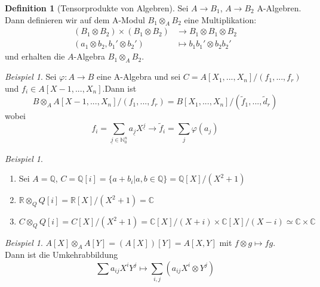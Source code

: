 \documentclass[10pt,a4paper]{article}
\newcommand{\N}{\ensuremath{\mathbb{N}}}
\newcommand{\Q}{\ensuremath{\mathbb{Q}}}
\newcommand{\R}{\ensuremath{\mathbb{R}}}
\newcommand{\C}{\ensuremath{\mathbb{C}}}
\newcommand{\ul}[1]{\underline{#1}}
\newcounter{thm}[section]
\theoremstyle{definition}
\newtheorem{definition}[thm]{Definition}
\theoremstyle{plain}
\theoremstyle{remark}
\newtheorem{exm}[thm]{Beispiel}
\begin{document}
\addtocounter{thm}{-1}
\begin{definition}[Tensorprodukte von Algebren]
	Sei $A\rightarrow  B_1$, $A\rightarrow  B_2$ A-Algebren.\\
	Dann definieren wir auf dem A-Modul $B_1\otimes_A B_2$ eine Multiplikation:
	\begin{align*}
	(B_1\otimes B_2)\times(B_1\otimes B_2)&\rightarrow B_1\otimes B_1\otimes B_2\\
	(a_1\otimes b_2,b_1'\otimes b_2')&\mapsto b_1b_1'\otimes b_2b_2'
	\end{align*}
	und erhalten die $A$-Algebra $B_1\otimes_A B_2$.
\end{definition}
\begin{exm}
	Sei $\varphi:A\to B$ eine A-Algebra und sei $C=A[X_1,...,X_n]/(f_1,...,f_r)$ und $f_i\in A[X-1,...,X_n]$.Dann ist
	\[B\otimes_A A[X-1,...,X_n]/(f_1,...,f_r)=B[X_1,...,X_n]/(\tilde{f}_1,...,\tilde{d}_r)\]
	wobei 
	\[f_i=\sum_{\ul{j}\in \N_0^n}a_{\ul{j}}X^{\ul{j}}\rightarrow \tilde{f}_i=\sum_j\varphi(a_j)\]
\end{exm}
\begin{exm}
	\begin{enumerate}
		\item Sei $A=\Q$, $C=\Q[i]=\{a+b_i|a,b\in\Q\}=\Q[X]/(X^2+1)$
		\item $\R\otimes_Q Q[i]=\R[X]/(X^2+1)=\C$
		\item $C\otimes_Q Q[i]=C[X]/(X^2+1)=\C[X]/(X+i)\times\C[X]/(X-i)\simeq\C\times\C$
	\end{enumerate}
\end{exm}
\begin{exm}
	$A[X]\otimes_A A[Y]=(A[X])[Y]=A[X,Y]$ mit $f\otimes g\mapsto fg$.\\
	Dann ist die Umkehrabbildung
	\[\sum a_{ij}X^iY^j\mapsto \sum_{i,j}(a_{ij}X^i\otimes Y^j)\]
\end{exm}

\setcounter{thm}{10}
\end{document}
